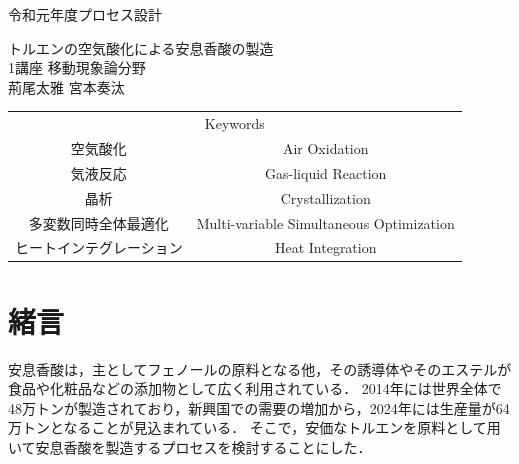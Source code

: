 \documentclass[a4j]{jsreport}
\begin{document}
\begin{titlepage}
\begin{flushleft}
{\Large 令和元年度プロセス設計} \\
\end{flushleft}
\vspace{5cm}
\centering
{\Huge トルエンの空気酸化による安息香酸の製造} \\
\vspace{2cm}
\centering
{\Large 1講座 移動現象論分野} \\
\vspace{0.5cm}
\centering
{\large 荊尾太雅  宮本奏汰} \\
\vspace{3cm}
\begin{table}[htbp]
    \begin{center}
        \begin{tabular}[htbp]{cc}
            \multicolumn{2}{c}{{\LARGE Keywords}} \\
            {\Large 空気酸化}&{\Large Air Oxidation} \\
            {\Large 気液反応}&{\Large Gas-liquid Reaction} \\
            {\Large 晶析}&{\Large Crystallization} \\
            {\Large 多変数同時全体最適化}&{\Large Multi-variable Simultaneous Optimization} \\
            {\Large ヒートインテグレーション}&{\Large Heat Integration} \\
        \end{tabular}
    \end{center}
\end{table}
\end{titlepage}


\setcounter{tocdepth}{2}
\tableofcontents

\clearpage
{}

\chapter{緒言}
安息香酸は，主としてフェノールの原料となる他，その誘導体やそのエステルが食品や化粧品などの添加物として広く利用されている．
2014年には世界全体で48万トンが製造されており，新興国での需要の増加から，2024年には生産量が64万トンとなることが見込まれている\cite{hexa}．
そこで，安価なトルエンを原料として用いて安息香酸を製造するプロセスを検討することにした．


\clearpage
\end{document}
